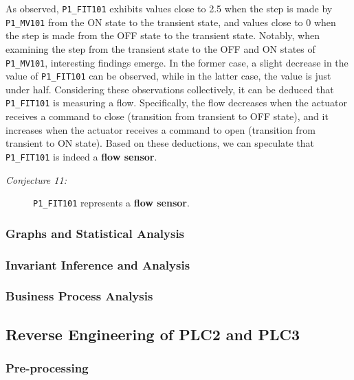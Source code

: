 As observed, \texttt{P1\_FIT101} exhibits values close to 2.5 when the step is made by \texttt{P1\_MV101} from the ON state to the transient state, and values close to 0 when the step is made from the OFF state to the transient state. Notably, when examining the step from the transient state to the OFF and ON states of \texttt{P1\_MV101}, interesting findings emerge. In the former case, a slight decrease in the value of \texttt{P1\_FIT101} can be observed, while in the latter case, the value is just under half.\newline 
Considering these observations collectively, it can be deduced that \texttt{P1\_FIT101} is measuring a flow. Specifically, the flow decreases when the actuator receives a command to close (transition from transient to OFF state), and it increases when the actuator receives a command to open (transition from transient to ON state). \newline 
Based on these deductions, we can speculate that \texttt{P1\_FIT101} is indeed a \textbf{flow sensor}.

\begin{description}
	\item[\colorbox{backcolourtext}{\normalfont\textit{Conjecture 11:}}] \texttt{P1\_FIT101} represents a \textbf{flow sensor}.
\end{description}

\subsubsection{Graphs and Statistical Analysis}
\label{subsubsec:6_P1P2_graphs}

\subsubsection{Invariant Inference and Analysis}
\label{subsubsec:6_P1P2_invariants}

\subsubsection{Business Process Analysis}
\label{subsubsec:6_P1P2_bpa}

\subsection{Reverse Engineering of PLC2 and PLC3}
\label{subsec:6_P2P3_analysis}

\subsubsection{Pre-processing}
\label{subsubsec:6_P2P3_preprocessing}

